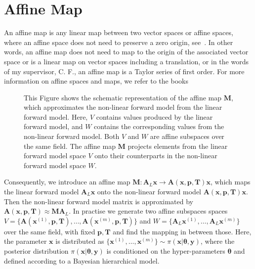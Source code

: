 \section{Affine Map}
\label{sec:affine}
An affine map is any linear map between two vector spaces or affine spaces, where an affine space does not need to preserve a zero origin, see~\cite[Def. 2.3.1]{berger2009geometry}.
In other words, an affine map does not need to map to the origin of the associated vector space or is a linear map on vector spaces including a translation, or in the words of my supervisor, C. F., an affine map is a Taylor series of first order.
For more information on affine spaces and maps, we refer to the books \cite{berger2009geometry, katsumi1994affine}
\begin{figure}[ht!]
	\centering
	\caption[Schematics of the affine map]{This Figure shows the schematic representation of the affine map $\bm{M}$, which approximates the non-linear forward model from the linear forward model. Here, $V$ contains values produced by the linear forward model, and $W$ contains the corresponding values from the non-linear forward model. Both $V$ and $W$ are affine subspaces over the same field. The affine map $\bm{M}$ projects elements from the linear forward model space $V$ onto their counterparts in the non-linear forward model space $W$.
	}
\end{figure}

Consequently, we introduce an affine map $ \bm{M}:\bm{A}_L \bm{x} \rightarrow \bm{A}(\bm{x},  \bm{p},\bm{T}) \bm{x}$, which maps the linear forward model $\bm{A}_L \bm{x}$ onto the non-linear forward model $\bm{A}(\bm{x},  \bm{p},\bm{T}) \bm{x}$.
Then the non-linear forward model matrix is approximated by $\bm{A}(\bm{x},  \bm{p},\bm{T}) \approx \bm{M} \bm{A}_L$.
In practise we generate two affine subspaces spaces $V = \big\{ \bm{A}(\bm{x}^{(1)}, \bm{p,T}), \dots ,\bm{A}(\bm{x}^{(m)}, \bm{p,T})\big\} $ and $W = \big\{ \bm{A}_L\bm{x}^{(1)}, \dots ,\bm{A}_L\bm{x}^{(m)}\big\}$ over the same field, with fixed $\bm{p,T}$ and find the mapping in between those.
Here, the parameter $\bm{x}$ is distributed as $\big\{  \bm{x}^{(1)} , \dots, \bm{x}^{(m)} \big\} \sim \pi(\bm{x}|\bm{\theta},\bm{y})$, where the posterior distribution $\pi(\bm{x}|\bm{\theta},\bm{y})$ is conditioned on the hyper-parameters $\bm{\theta}$ and defined according to a Bayesian hierarchical model.


